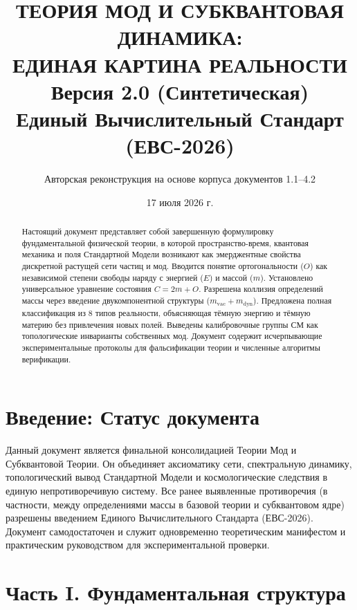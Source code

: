 \documentclass[12pt,a4paper]{article}
\title{\textbf{ТЕОРИЯ МОД И СУБКВАНТОВАЯ ДИНАМИКА:\\ ЕДИНАЯ КАРТИНА РЕАЛЬНОСТИ}\\
\large Версия 2.0 (Синтетическая)\\
\large Единый Вычислительный Стандарт (ЕВС-2026)}
\author{Авторская реконструкция на основе корпуса документов 1.1--4.2}
\date{17 июля 2026 г.}
\begin{document}
\maketitle
\thispagestyle{fancy}

\begin{abstract}
Настоящий документ представляет собой завершенную формулировку фундаментальной физической теории, в которой пространство-время, квантовая механика и поля Стандартной Модели возникают как эмерджентные свойства дискретной растущей сети частиц и мод. Вводится понятие ортогональности ($O$) как независимой степени свободы наряду с энергией ($E$) и массой ($m$). Установлено универсальное уравнение состояния $C = 2m + O$. Разрешена коллизия определений массы через введение двукомпонентной структуры ($m_{\text{vac}} + m_{\text{dyn}}$). Предложена полная классификация из 8 типов реальности, объясняющая тёмную энергию и тёмную материю без привлечения новых полей. Выведены калибровочные группы СМ как топологические инварианты собственных мод. Документ содержит исчерпывающие экспериментальные протоколы для фальсификации теории и численные алгоритмы верификации.
\end{abstract}

\tableofcontents
\newpage

\section*{Введение: Статус документа}

Данный документ является финальной консолидацией Теории Мод и Субквантовой Теории. Он объединяет аксиоматику сети, спектральную динамику, топологический вывод Стандартной Модели и космологические следствия в единую непротиворечивую систему. Все ранее выявленные противоречия (в частности, между определениями массы в базовой теории и субквантовом ядре) разрешены введением Единого Вычислительного Стандарта (ЕВС-2026). Документ самодостаточен и служит одновременно теоретическим манифестом и практическим руководством для экспериментальной проверки.

\section{Часть I. Фундаментальная структура}
\end{document}
